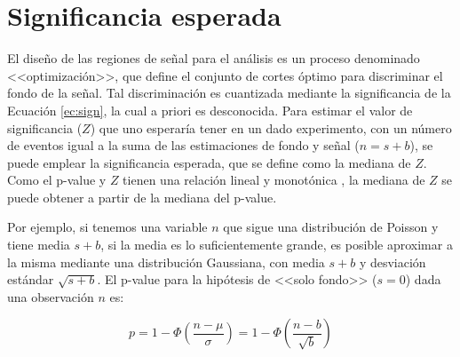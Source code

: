 
 

\section{Significancia esperada}\label{sec:exp_sig}

El diseño de las regiones de señal para el análisis es un proceso denominado <<optimización>>, que define el conjunto de cortes óptimo para discriminar el fondo de la señal. Tal discriminación es cuantizada mediante la significancia de la Ecuación \ref{ec:sign}, la cual a priori es desconocida. Para estimar el valor de significancia ($Z$) que uno esperaría tener en un dado experimento, con un número de eventos igual a la suma de las estimaciones de fondo y señal ($n=s+b$), se puede emplear la significancia esperada, que se define como la mediana de $Z$. Como el p-value y $Z$ tienen una relación lineal y monotónica \cite{Cowan:2010js}, la mediana de $Z$ se puede obtener a partir de la mediana del p-value.


Por ejemplo, si tenemos una variable $n$ que sigue una distribución de Poisson y tiene media $s+b$, si la media es lo suficientemente grande, es posible aproximar a la misma mediante una distribución Gaussiana, con media $s+b$ y desviación estándar $\sqrt{s+b}$. El p-value para la hipótesis de <<solo fondo>> ($s=0$) dada una observación $n$ es:

\begin{equation}
	p = 1 - \Phi\left( \frac{n-\mu}{\sigma} \right) = 1 - \Phi\left( \frac{n-b}{\sqrt{b}} \right)
\end{equation}

